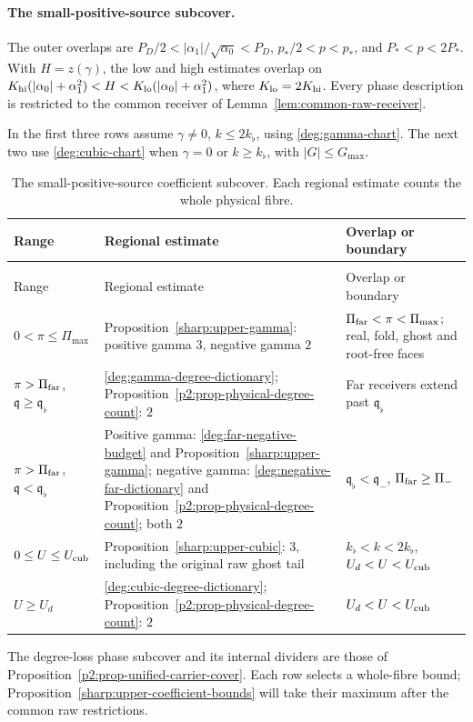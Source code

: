 \paragraph{The small-positive-source subcover.}
\label{sec:cover-index}\label{subsec:cover-index}
The outer overlaps are \(P_D/2<|\alpha_1|/\sqrt{\alpha_0}<P_D\),
\(p_*/2<p<p_*\), and \(P_*<p<2P_*\). With
\(H=z(\gamma)\), the low and high estimates overlap on
\(K_{\rm hi}(|\alpha_0|+\alpha_1^2)<H<
K_{\rm lo}(|\alpha_0|+\alpha_1^2)\), where
\(K_{\rm lo}=2K_{\rm hi}\). Every phase description is restricted
to the common receiver of Lemma~\ref{lem:common-raw-receiver}.

In the first three rows assume \(\gamma\ne0\), \(k\le2k_\flat\),
using \eqref{deg:gamma-chart}. The next two use \eqref{deg:cubic-chart}
when \(\gamma=0\) or \(k\ge k_\flat\), with \(|G|\le G_{\max}\).
\begingroup
\let\vss\vfil
\small
\setlength{\tabcolsep}{4pt}
\renewcommand{\arraystretch}{1.08}
\begin{longtable}{@{}>{\raggedright\arraybackslash}p{.31\linewidth}>{\raggedright\arraybackslash}p{.39\linewidth}>{\raggedright\arraybackslash}p{.23\linewidth}@{}}
\caption{The small-positive-source coefficient subcover. Each regional estimate
counts the whole physical fibre.}\label{tab:coefficient-phase-cover}\\
\hline
Range & Regional estimate & Overlap or boundary\\
\hline
\endfirsthead
\multicolumn{3}{l}{\tablename\ \thetable\ (continued)}\\
\hline
Range & Regional estimate & Overlap or boundary\\
\hline
\endhead
\hline
\endfoot
\(0<\pi\le\Pi_{\max}\)
 & Proposition~\ref{sharp:upper-gamma}: positive gamma \(3\), negative gamma \(2\)
 & \(\Pi_{\rm far}<\pi<\Pi_{\max}\); real, fold, ghost and root-free faces\\
\(\pi>\Pi_{\rm far}\), \(\mathfrak q\ge\mathfrak q_\flat\)
 & \eqref{deg:gamma-degree-dictionary}; Proposition~\ref{p2:prop-physical-degree-count}: \(2\)
 & Far receivers extend past \(\mathfrak q_\flat\)\\
\(\pi>\Pi_{\rm far}\), \(\mathfrak q<\mathfrak q_\flat\)
 & Positive gamma: \eqref{deg:far-negative-budget} and Proposition~\ref{sharp:upper-gamma}; negative gamma: \eqref{deg:negative-far-dictionary} and Proposition~\ref{p2:prop-physical-degree-count}; both \(2\)
 & \(\mathfrak q_\flat<\mathfrak q_-\), \(\Pi_{\rm far}\ge\Pi_-\)\\
\(0\le U\le U_{\rm cub}\)
 & Proposition~\ref{sharp:upper-cubic}: \(3\), including the original raw ghost tail
 & \(k_\flat<k<2k_\flat\), \(U_d<U<U_{\rm cub}\)\\
\(U\ge U_d\)
 & \eqref{deg:cubic-degree-dictionary}; Proposition~\ref{p2:prop-physical-degree-count}: \(2\)
 & \(U_d<U<U_{\rm cub}\)\\
\end{longtable}
\endgroup

The degree-loss phase subcover and its internal dividers are those of
Proposition~\ref{p2:prop-unified-carrier-cover}. Each row selects a
whole-fibre bound; Proposition~\ref{sharp:upper-coefficient-bounds}
will take their maximum after the common raw restrictions.
